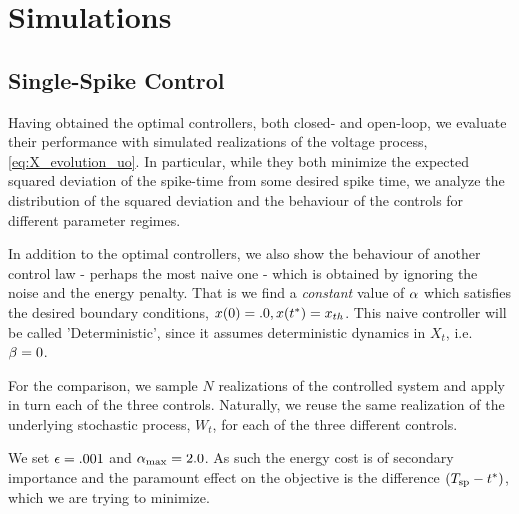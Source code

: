 \documentclass[12pt]{iopart}
\begin{document}

\section{Simulations} 
\subsection{Single-Spike Control}
\label{sec:probabilistic_numerical_test}
Having obtained the optimal controllers, both closed- and open-loop, we evaluate
their performance with simulated realizations of the voltage process,
\cref{eq:X_evolution_uo}. In particular, while they both minimize the expected
squared deviation of the spike-time from some desired spike time, we analyze
the distribution of the squared deviation and the behaviour of the
controls for different parameter regimes.

In addition to the optimal controllers, we also show the behaviour of
another control law - perhaps the most naive one - which is obtained by ignoring
the noise and the energy penalty. That is we find a {\sl constant} value of ${\alpha}$
which satisfies the desired boundary conditions, $x(0) = .0, x({ t^* }) = { x_{th} }$. This naive
controller will be called 'Deterministic', since it assumes deterministic
dynamics in $X_t$, i.e.\ ${\beta} = 0$.

For the comparison, we sample $N$ realizations of the controlled system
and apply in turn each of the three controls. Naturally, we reuse the same
realization of the underlying stochastic process, $W_t$, for each of the
three different controls.

We set ${\epsilon} = .001$ and ${ {\alpha}_{\textrm{max}} } = 2.0$. As such the energy cost is of secondary
importance and the paramount effect on the objective is the difference $({ T_{\textrm{sp} } } -
{ t^* })$, which we are trying to minimize.
\end{document}
